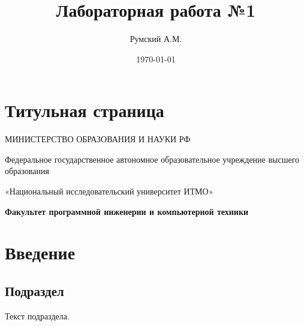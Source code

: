 \documentclass{report} %
\begin{document}
	
	\title{Лабораторная работа №1}  
	\author{Румский А.М.}  
	\date{\today}  
	\maketitle                  %
	
	\section{Титульная страница}
	\begin{center}
		МИНИСТЕРСТВО ОБРАЗОВАНИЯ И НАУКИ РФ
	
		Федеральное государственное автономное образовательное учреждение высшего образования 
		
		«Национальный исследовательский университет ИТМО»
		
		\textbf{Факультет программной инженерии и компьютерной техники}
	\end{center}
	
	\section{Введение}          %
	 
	
	\subsection{Подраздел}      %
	Текст подраздела.  
	
\end{document}
